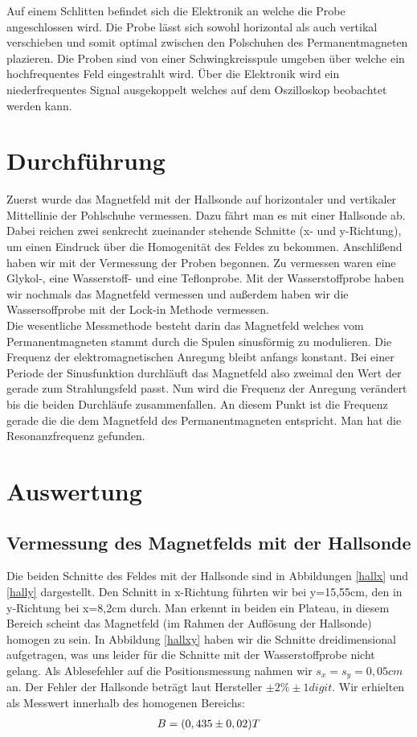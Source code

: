 \documentclass[12pt]{article}
\begin{document}
Auf einem Schlitten befindet sich die Elektronik an welche die Probe angeschlossen wird. Die Probe lässt sich sowohl horizontal als auch vertikal verschieben und somit optimal zwischen den Polschuhen des Permanentmagneten plazieren.
Die Proben sind von einer Schwingkreisspule umgeben über welche ein hochfrequentes Feld eingestrahlt wird. Über die Elektronik wird ein niederfrequentes Signal ausgekoppelt welches auf dem Oszilloskop beobachtet werden kann.

\section{Durchführung}

Zuerst wurde das Magnetfeld mit der Hallsonde auf horizontaler und vertikaler Mittellinie der Pohlschuhe vermessen.
Dazu fährt man es mit einer Hallsonde ab. Dabei reichen zwei senkrecht zueinander stehende Schnitte (x- und y-Richtung), um einen Eindruck über die Homogenität des Feldes zu bekommen.
 Anschlißend haben wir mit der Vermessung der Proben begonnen. Zu vermessen waren eine Glykol-, eine Wasserstoff- und eine Teflonprobe. Mit der Wasserstoffprobe haben wir nochmals das Magnetfeld vermessen und außerdem haben wir die Wassersoffprobe mit der Lock-in Methode vermessen.\\


Die wesentliche Messmethode besteht darin das Magnetfeld welches vom Permanentmagneten stammt durch die Spulen sinusförmig zu modulieren. Die Frequenz der elektromagnetischen Anregung bleibt anfangs konstant. Bei einer Periode der Sinusfunktion durchläuft das Magnetfeld also zweimal den Wert der gerade zum Strahlungsfeld passt. Nun wird die Frequenz der Anregung verändert bis die beiden Durchläufe zusammenfallen. An diesem Punkt ist die Frequenz gerade die die dem Magnetfeld des Permanentmagneten entspricht. Man hat die Resonanzfrequenz gefunden.


\section{Auswertung}
\subsection{Vermessung des Magnetfelds mit der Hallsonde}
Die beiden Schnitte des Feldes mit der Hallsonde sind in Abbildungen \ref{hallx} und \ref{hally} dargestellt. Den Schnitt in x-Richtung führten wir bei y=15,55cm, den in y-Richtung bei x=8,2cm durch. Man erkennt in beiden ein Plateau, in diesem Bereich scheint das Magnetfeld (im Rahmen der Auflösung der Hallsonde) homogen zu sein. In Abbildung \ref{hallxy} haben wir die Schnitte dreidimensional aufgetragen, was uns leider für die Schnitte mit der Wasserstoffprobe nicht gelang. Als Ablesefehler auf die Positionsmessung nahmen wir $s_x = s_y = 0,05cm$ an. Der Fehler der Hallsonde beträgt laut Hersteller $\pm 2\% \pm 1digit$. Wir erhielten als Messwert innerhalb des homogenen Bereichs:
\begin{align}
 \notag B=(0,435 \pm 0,02) T
\end{align}
\end{document}
